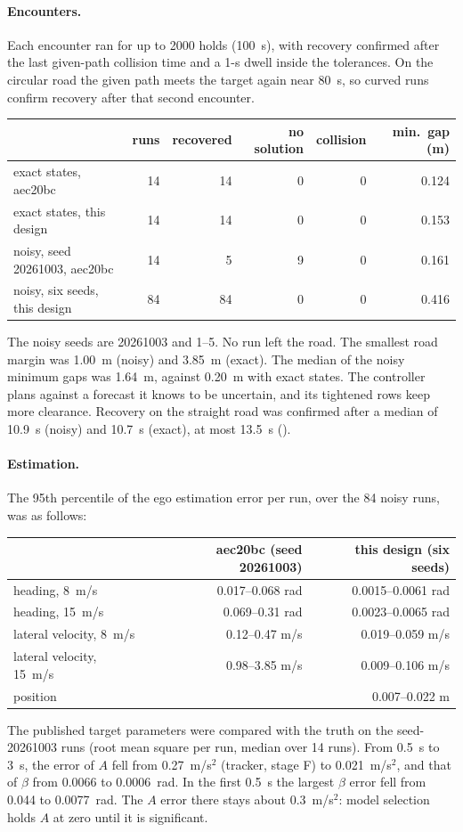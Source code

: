 \documentclass[11pt]{article}
\begin{document}
\paragraph{Encounters.} Each encounter ran for up to 2000 holds (100~s), with
recovery confirmed after the last given-path collision time and a 1-s dwell
inside the tolerances. On the circular road the given path meets the target
again near 80~s, so curved runs confirm recovery after that second encounter.
\begin{center}
\begin{tabular}{lrrrrr}
\toprule
 & runs & recovered & no solution & collision & min.\ gap (m)\\
\midrule
exact states, aec20bc & 14 & 14 & 0 & 0 & 0.124\\
exact states, this design & 14 & 14 & 0 & 0 & 0.153\\
noisy, seed 20261003, aec20bc & 14 & 5 & 9 & 0 & 0.161\\
noisy, six seeds, this design & 84 & 84 & 0 & 0 & 0.416\\
\bottomrule
\end{tabular}
\end{center}
The noisy seeds are 20261003 and 1--5. No run left the road. The smallest road
margin was 1.00~m (noisy) and 3.85~m (exact). The median of the noisy minimum
gaps was 1.64~m, against 0.20~m with exact states. The controller plans
against a forecast it knows to be uncertain, and its tightened rows keep more
clearance. Recovery on the straight road was confirmed after a median of
10.9~s (noisy) and 10.7~s (exact), at most 13.5~s
().

\paragraph{Estimation.} The 95th percentile of the ego estimation error per
run, over the 84 noisy runs, was as follows:
\begin{center}
\begin{tabular}{lrr}
\toprule
 & aec20bc (seed 20261003) & this design (six seeds)\\
\midrule
heading, 8~m/s & 0.017--0.068 rad & 0.0015--0.0061 rad\\
heading, 15~m/s & 0.069--0.31 rad & 0.0023--0.0065 rad\\
lateral velocity, 8~m/s & 0.12--0.47 m/s & 0.019--0.059 m/s\\
lateral velocity, 15~m/s & 0.98--3.85 m/s & 0.009--0.106 m/s\\
position & & 0.007--0.022 m\\
\bottomrule
\end{tabular}
\end{center}
The published target parameters were compared with the truth on the
seed-20261003 runs (root mean square per run, median over 14 runs). From
0.5~s to 3~s, the error of $A$ fell from 0.27~m/s$^2$ (tracker, stage F) to
0.021~m/s$^2$, and that of $\beta$ from 0.0066 to 0.0006~rad. In the first
0.5~s the largest $\beta$ error fell from 0.044 to 0.0077~rad. The $A$ error
there stays about 0.3~m/s$^2$: model selection holds $A$ at zero until it is
significant.
\end{document}
